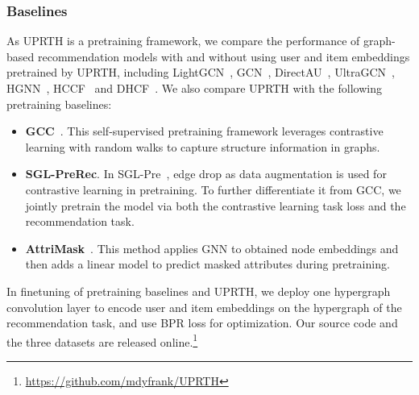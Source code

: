 \subsubsection{Baselines}
As UPRTH is a pretraining framework, we compare the performance of graph-based recommendation models with and without using user and item embeddings pretrained by UPRTH, including LightGCN~\cite{LightGCN}, GCN~\cite{GCN16}, DirectAU~\cite{auloss}, UltraGCN~\cite{ultragcn}, HGNN~\cite{feng19}, HCCF~\cite{hccf} and DHCF~\cite{dhcf}.
We also compare UPRTH with the following pretraining baselines:
\begin{itemize}[leftmargin=*]
    \item \textbf{GCC}~\cite{gcc}. This self-supervised pretraining framework leverages contrastive learning with random walks to capture structure information in graphs.
    \item \textbf{SGL-PreRec}. In SGL-Pre~\cite{sgl}, edge drop as data augmentation is used for contrastive learning in pretraining. To further differentiate it from GCC, we jointly pretrain the model via both the contrastive learning task loss and the recommendation task.
    \item \textbf{AttriMask}~\cite{weihua20}. This method applies GNN to obtained node embeddings and then adds a linear model to predict masked attributes during pretraining.
\end{itemize}
In finetuning of pretraining baselines and UPRTH, we deploy one hypergraph convolution layer to encode user and item embeddings on the hypergraph of the recommendation task, and use BPR loss for optimization. Our source code and the three datasets are released online.\footnote{\url{https://github.com/mdyfrank/UPRTH}}

